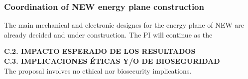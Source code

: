 \documentclass[a4paper,11pt,oneside]{article}
\begin{document}
\subsubsection*{Coordination of NEW energy plane construction}
The main mechanical and electronic designes for the energy plane of
NEW are already decided and under construction. The PI will continue
as the

\noindent\textbf{C.2. IMPACTO ESPERADO DE LOS RESULTADOS}\\


\noindent\textbf{C.3. IMPLICACIONES \'ETICAS Y/O DE BIOSEGURIDAD}\\
The proposal involves no ethical nor biosecurity implications.
\end{document}
